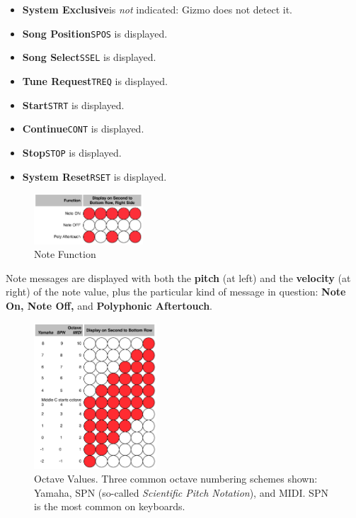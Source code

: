 \documentclass{article}
\begin{document}
\begin{itemize}
\begin{center}
\begin{tabular}{@{}rlll@{}}
\end{tabular}\end{center}
\item {\bf System Exclusive}\quad is {\it not} indicated: Gizmo does not detect it.
\item {\bf Song Position}\quad \texttt{SPOS} is displayed.
\item {\bf Song Select}\quad \texttt{SSEL} is displayed.
\item {\bf Tune Request}\quad \texttt{TREQ} is displayed.
\item {\bf Start}\quad \texttt{STRT} is displayed.
\item {\bf Continue}\quad \texttt{CONT} is displayed.
\item {\bf Stop}\quad \texttt{STOP} is displayed.
\item {\bf System Reset}\quad \texttt{RSET} is displayed.
\end{itemize}


\begin{figure}
\vspace{-37em}\includegraphics[width=1.6in]{notefunction.pdf}
\vspace{-2em}\caption{\small Note Function}
\label{notefunction}
\end{figure}


Note messages are displayed with both the {\bf pitch} (at left) and the {\bf velocity} (at right) of the note value, plus the particular kind of message in question: {\bf Note On, Note Off,} and {\bf Polyphonic Aftertouch}.

\begin{figure}
\vspace{-32em}
\includegraphics[width=1.8in]{octave.pdf}
\vspace{-2em}\caption{\small Octave Values.  Three common octave numbering schemes shown: Yamaha, SPN (so-called {\it Scientific Pitch Notation}), and MIDI.  SPN is the most common on keyboards.}\vspace{-5em}
\label{octave}
\end{figure}
\end{document}
